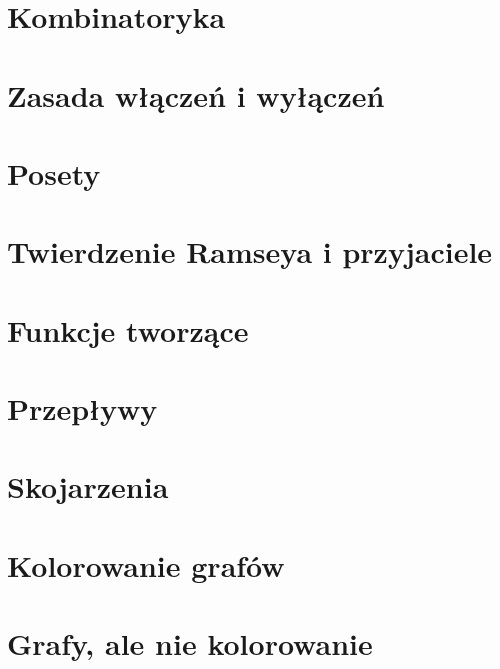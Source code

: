 \documentclass[12pt, a4paper, polish, openany]{book}
\author{
}
\begin{document}
\frontmatter



\tableofcontents


\mainmatter

\chapter{Kombinatoryka}


\chapter{Zasada włączeń i wyłączeń}


\chapter{Posety}


\chapter{Twierdzenie Ramseya i przyjaciele}


\chapter{Funkcje tworzące}


\chapter{Przepływy}


\chapter{Skojarzenia}


\chapter{Kolorowanie grafów}


\chapter{Grafy, ale nie kolorowanie}

\end{document}
